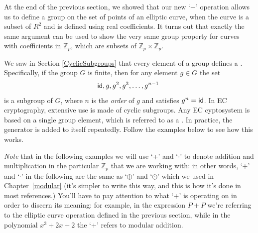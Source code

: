 At the end of the previous section, we showed that our new  `+' operation allows us to define a group on the set of points of an elliptic curve, when the curve is a subset of $R^2$ and is defined using real coefficients.  It turns out that exactly the same argument can be used to show the very same group property for curves with coefficients in $\mathbb{Z}_p$, which are subsets of $\mathbb{Z}_p \times \mathbb{Z}_p$.  

We saw in Section \ref{CyclicSubgroups} that every element of a group defines a . Specifically, if the group $G$ is finite, then for any element $g \in G$ the set 
\[ {\sf{i}d}, g, g^2, g^3, \ldots, g^{n-1} \ \]
is a subgroup of $G$, where $n$ is the \emph{order} of $g$ and satisfies $g^n = {\sf{i}d}$. In EC cryptography, extensive use is made of cyclic subgroups.  Any EC cyptosystem is based on a single group element, which is referred to as a .  In practice, the generator is added to itself repeatedly. Follow the examples below to see how this works.

\emph{Note} that in the following examples we will use `+'  and `$\cdot$' to denote addition and multiplication in the particular  $\mathbb{Z}_p$ that we are working with: in other words, `+' and `$\cdot$' in the following are the same as `$\oplus$' and `$\odot$' which we used in Chapter~\ref{modular}  (it's simpler to write this way, and this is how it's done in most references.) You'll have to pay attention to what `+' is operating on in order to discern its meaning:  for example, in the expression $P+P$ we're referring to the elliptic curve operation defined in the previous section, while in the polynomial $x^3 + 2x + 2$  the `+' refers to modular addition. 

